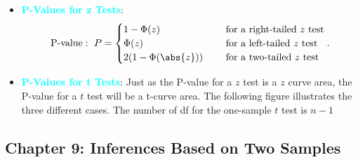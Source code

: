 \documentclass{report}
\begin{document}
\begin{itemize}
        \item \textbf{\textcolor{cyan}{P-Values for z Tests}}:
            \begin{align*}
                \text{P-value}:\ P= 
                \begin{cases}
                     1-\Phi(z) & \quad \text{ for a right-tailed $z$ test}  \\
                     \Phi(z) & \quad \text{ for a left-tailed $z$ test}  \\
                     2(1-\Phi(\abs{z})) & \quad \text{ for a two-tailed $z$ test}  
                \end{cases}
            .\end{align*}
            \bigbreak \noindent 
        \item \textbf{\textcolor{cyan}{P-Values for t Tests}}:
            Just as the P-value for a $z$ test is a $z$ curve area, the P-value for a $t$ test will be a t-curve area. The following figure illustrates the three different cases. The number of df for the one-sample $t$ test is $n-1$
            \bigbreak \noindent 
    \end{itemize}

    \pagebreak 
    \subsection{Chapter 9: Inferences Based on Two Samples}
    \bigbreak \noindent 
\end{document}
